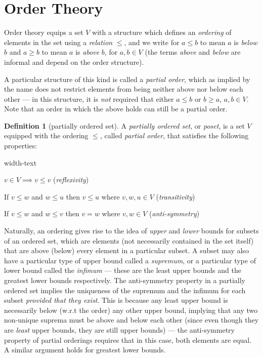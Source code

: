 \documentclass[letterpaper,10pt,oneside,onecolumn,reqno]{amsart}
\theoremstyle{definition}
\newtheorem{defn}{Definition}
\begin{document}
\part{Order Theory}

Order theory equips a set $V$ with a structure which defines an
\emph{ordering} of elements in the set using a \emph{relation} $\leq$,
and we write for $a \leq b$ to mean $a$ is \emph{below} $b$ and $a
\geq b$ to mean $a$ is \emph{above} $b$, for $a,b \in V$ (the terms
\emph{above} and \emph{below} are informal and depend on the order
structure).

A particular structure of this kind is called a \emph{partial order},
which as implied by the name does not restrict elements from being
neither above nor below each other --- in this structure, it is
\emph{not} required that either $a \leq b$ or $b \geq a$, $a,b \in
V$. Note that an order in which the above holds can still be a partial
order.

\begin{framed}
  \begin{defn}[partially ordered set]\label{def:2}
    A \emph{partially ordered set}, or
    \emph{poset}, is a set $V$ equipped with the ordering
    $\leq$, called \emph{partial order}, that satisfies the following
    properties:

    \begin{deflist}{width-text}
    \item $v \in V \implies v \leq v$ (\emph{reflexivity})
    \item If $v \leq w$ and $w \leq u$ then $v \leq u$ where $v,w,u
      \in V$ (\emph{transitivity})
    \item If $v \leq w$ and $w \leq v$ then $v = w$ where $v,w \in V$
      (\emph{anti-symmetry})
    \end{deflist}
  \end{defn}
\end{framed}

Naturally, an ordering gives rise to the idea of \emph{upper} and
\emph{lower} bounds for subsets of an ordered set, which are elements
(not necessarily contained in the set itself) that are above (below)
every element in a particular subset. A subset may also have a
particular type of upper bound called a \emph{supremum}, or a
particular type of lower bound called the \emph{infimum} --- these are
the least upper bounds and the greatest lower bounds respectively. The
anti-symmetry property in a partially ordered set implies the
uniqueness of the supremum and the infimum for each subset
\emph{provided that they exist}. This is because any least upper bound
is necessarily below (w.r.t the order) any other upper bound, implying
that any two non-unique suprema must be above and below each other
(since even though they are \emph{least} upper bounds, they are still
upper bounds) --- the anti-symmetry property of partial orderings
requires that in this case, both elements are equal. A similar
argument holds for greatest lower bounds.
\end{document}
